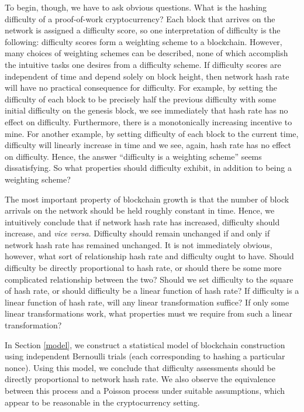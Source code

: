 \documentclass[12pt,english]{mrl}
\theoremstyle{definition}
\numberwithin{equation}{section}
\numberwithin{figure}{section}
\numberwithin{equation}{section}
\numberwithin{equation}{section}
\numberwithin{figure}{section}
\begin{document}
To begin, though, we have to ask obvious questions. What is the hashing difficulty of a proof-of-work cryptocurrency? Each block that arrives on the network is assigned a difficulty score, so one interpretation of difficulty is the following: difficulty scores form a weighting scheme to a blockchain. However, many choices of weighting schemes can be described, none of which accomplish the intuitive tasks one desires from a difficulty scheme. If difficulty scores are independent of time and depend solely on block height, then network hash rate will have no practical consequence for difficulty. For example, by setting the difficulty of each block to be precisely half the previous difficulty with some initial difficulty on the genesis block, we see immediately that hash rate has no effect on difficulty. Furthermore, there is a monotonically increasing incentive to mine. For another example, by setting difficulty of each block to the current time, difficulty will linearly increase in time and we see, again, hash rate has no effect on difficulty. Hence, the answer ``difficulty is a weighting scheme'' seems dissatisfying. So what properties should difficulty exhibit, in addition to being a weighting scheme?

The most important property of blockchain growth is that the number of block arrivals on the network should be held roughly constant in time. Hence, we intuitively conclude that if network hash rate has increased, difficulty should increase, and \textit{vice versa}. Difficulty should remain unchanged if and only if network hash rate has remained unchanged. It is not immediately obvious, however, what sort of relationship hash rate and difficulty ought to have. Should difficulty be directly proportional to hash rate, or should there be some more complicated relationship between the two? Should we set difficulty to the square of hash rate, or should difficulty be a linear function of hash rate? If difficulty is a linear function of hash rate, will any linear transformation suffice? If only some linear transformations work, what properties must we require from such a linear transformation?

In Section \ref{model}, we construct a statistical model of blockchain construction using independent Bernoulli trials (each corresponding to hashing a particular nonce). Using this model, we conclude that difficulty assessments should be directly proportional to network hash rate. We also observe the equivalence between this process and a Poisson process under suitable assumptions, which appear to be reasonable in the cryptocurrency setting.
\end{document}
